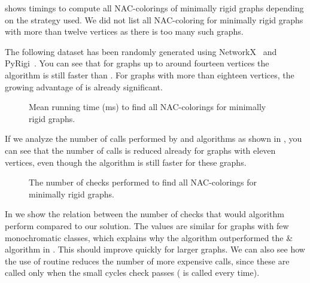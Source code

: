 shows timings to compute all NAC-colorings of minimally rigid graphs
depending on the strategy used.
We did not list all NAC-coloring for minimally rigid graphs with more than twelve vertices
as there is too many such graphs.

The following dataset has been randomly generated
using NetworkX~\cite{networkx} and PyRigi~\cite{pyrigi}.
%
You can see that for graphs up to around fourteen vertices the \NaiveCycles{} algorithm
is still faster than \Subgraphs{}.
For graphs with more than eighteen vertices,
the growing advantage of \Subgraphs{} is already significant.

\begin{figure}[ht]
	\centering
	\scalebox{0.5}{}
	\caption[Running time for minimally rigid graphs.]{
		Mean running time (ms) to find all NAC-colorings for minimally rigid graphs.}%
	\label{fig:graph_time_minimally_rigid}
\end{figure}

If we analyze the number of \IsNACColoring{} calls performed by \NaiveCycles{} and \Subgraphs{} algorithms
as shown in ,
you can see that the number of \IsNACColoring{} calls is reduced already for graphs
with eleven vertices,
even though the \NaiveCycles{} algorithm is still faster for these graphs.

\begin{figure}[ht]
	\centering
	\scalebox{0.5}{}
	\caption[Checks performed for minimally rigid graphs.]{
		The number of checks performed to find all NAC-colorings for minimally rigid graphs.}%
	\label{fig:graph_count_minimally_rigid}
\end{figure}

In 
we show the relation between the number of \IsNACColoring{} checks that
would \Naive{} algorithm perform compared to our solution.
The values are similar for graphs with few monochromatic classes,
which explains why the \NaiveCycles{} algorithm outperformed
the \NeighborsDegree{}\&\MergeLinear{} algorithm in . This should improve quickly for larger graphs.
We can also see how the use of \CycleMask{} routine
reduces the number of more expensive \IsNACColoring{} calls,
since these are called only when the small cycles check \CycleMask{} passes
(\CycleMask{} is called every time).

